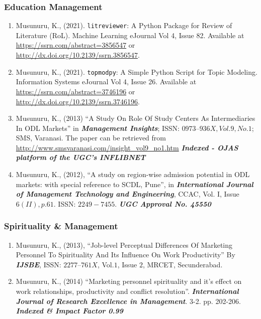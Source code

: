 \documentclass[10pt]{article}
\begin{document}
\subsubsection{Education Management}

\begin{enumerate}

\item Musunuru, K., (2021). \texttt{litreviewer}: A Python Package for Review of Literature (RoL). Machine Learning eJournal
Vol 4, Issue 82. Available at \url{https://ssrn.com/abstract=3856547} or \url{http://dx.doi.org/10.2139/ssrn.3856547}. 

\item Musunuru, K., (2021). \texttt{topmodpy}: A Simple Python Script for Topic Modeling. Information Systems eJournal
Vol 4, Issue 26. Available at \url{https://ssrn.com/abstract=3746196} or \url{http://dx.doi.org/10.2139/ssrn.3746196}. 

\item Musunuru, K., (2013) \enquote{A Study On Role Of Study Centers As Intermediaries In ODL Markets} in \textit{\textbf{Management Insights}}; ISSN: $0973 – 936X, Vol.9, No. 1$; SMS, Varanasi. The paper can be retrieved from \url{http://www.smsvaranasi.com/insight_vol9_no1.htm} \emph{\textbf{Indexed - OJAS platform of the UGC’s INFLIBNET}}

\item Musunuru, K., (2012), \enquote{A study on region-wise admission potential in ODL markets: with special reference to SCDL, Pune}, in \textit{\textbf{International Journal of Management Technology and Engineering}}, CCAC, Vol. I, Issue $6 (II), p.61$. ISSN: $2249-7455$. \emph{\textbf{UGC Approval No. 45550 }}


\end{enumerate}

\subsubsection{Spirituality \& Management}
\begin{enumerate}

\item Musunuru, K., (2013), \enquote{Job-level Perceptual Differences Of Marketing Personnel To Spirituality And Its  Influence  On  Work  Productivity} By \textit{\textbf{IJSBE}}, ISSN: $2277 – 761X$, Vol.$1$, Issue $2$, MRCET, Secunderabad.

\item Musunuru, K., (2014) \enquote{Marketing personnel spirituality and it's effect on work relationships, productivity and conflict resolution}. \emph{\textbf{International Journal of Research Excellence in Management}}. 3-2. pp. 202-206. \emph{\textbf{Indexed \& Impact Factor 0.99}}

\end{enumerate}
\end{document}
